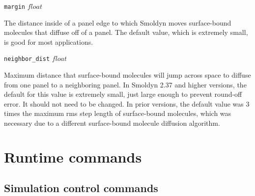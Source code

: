 \documentclass {book}
\newcommand {\ttt} {\texttt}
\begin{document}
\begin{description}
\item{\ttt{margin} $float$}

The distance inside of a panel edge to which Smoldyn moves surface-bound molecules that diffuse off of a panel. The default value, which is extremely small, is good for most applications.

\item{\ttt{neighbor\_dist} $float$}

Maximum distance that surface-bound molecules will jump across space to diffuse from one panel to a neighboring panel. In Smoldyn 2.37 and higher versions, the default for this value is extremely small, just large enough to prevent round-off error. It should not need to be changed. In prior versions, the default value was 3 times the maximum rms step length of surface-bound molecules, which was necessary due to a different surface-bound molecule diffusion algorithm.

\end{description}



\chapter{Runtime commands}

\section{Simulation control commands}
\end{document}
